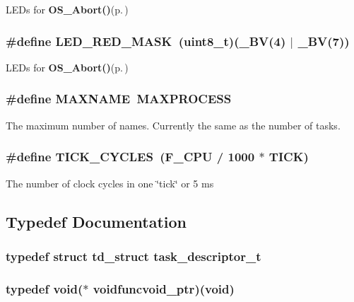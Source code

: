LEDs for {\bf OS\_\-Abort()}{\rm (p.\,\pageref{os_8c_b5747390a8be675282cb93e5198bd085})} 
\subsubsection{\setlength{\rightskip}{0pt plus 5cm}\#define LED\_\-RED\_\-MASK~(uint8\_\-t)(\_\-BV(4) $|$ \_\-BV(7))}\label{kernel_8h_a829d3ad38c6bb1818091cd1079e8c25}


LEDs for {\bf OS\_\-Abort()}{\rm (p.\,\pageref{os_8c_b5747390a8be675282cb93e5198bd085})} 
\subsubsection{\setlength{\rightskip}{0pt plus 5cm}\#define MAXNAME~MAXPROCESS}\label{kernel_8h_c881f02a50b29d3ffa5b1f4a0e4f9568}


The maximum number of names. Currently the same as the number of tasks. 
\subsubsection{\setlength{\rightskip}{0pt plus 5cm}\#define TICK\_\-CYCLES~(F\_\-CPU / 1000 $\ast$ TICK)}\label{kernel_8h_e8bd5ed849336321571c36fd6b820a36}


The number of clock cycles in one \char`\"{}tick\char`\"{} or 5 ms 

\subsection{Typedef Documentation}
\subsubsection{\setlength{\rightskip}{0pt plus 5cm}typedef struct {\bf td\_\-struct} {\bf task\_\-descriptor\_\-t}}\label{kernel_8h_d7f82f8defd3aacf359fc6e96a298632}


\subsubsection{\setlength{\rightskip}{0pt plus 5cm}typedef void($\ast$ {\bf voidfuncvoid\_\-ptr})(void)}\label{kernel_8h_7f905d588e73f00a4486c43ebfd638d4}




